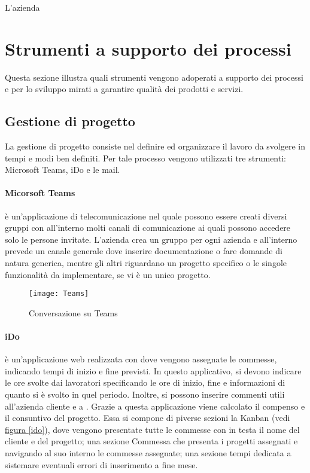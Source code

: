 L'azienda

\newpage

\section{Strumenti a supporto dei processi}
\label{cap1:Strumenti a supporto dei processi}

Questa sezione illustra quali strumenti vengono adoperati a supporto dei processi e per lo sviluppo mirati a garantire qualità dei prodotti e servizi.

\subsection{Gestione di progetto}
\label{cap1:Gestione di progetto}

La gestione di progetto consiste nel definire ed organizzare il lavoro da svolgere in tempi e modi ben definiti. Per tale processo vengono utilizzati tre strumenti: Microsoft Teams, iDo e le mail.

\paragraph{Micorsoft Teams} è un'applicazione di telecomunicazione nel quale possono essere creati diversi gruppi con all'interno molti canali di comunicazione ai quali possono accedere solo le persone invitate. L'azienda crea un gruppo per ogni azienda e all'interno prevede un canale generale dove inserire documentazione o fare domande di natura generica, mentre gli altri riguardano un progetto specifico o le singole funzionalità da implementare, se vi è un unico progetto. 

\begin{figure}[!h] 
	\centering 
	\texttt{[image: Teams]} 
	\caption{Conversazione su Teams}
\end{figure}


\paragraph{iDo} è un'applicazione web realizzata con \inde dove vengono assegnate le commesse, indicando tempi di inizio e fine previsti. In questo applicativo, si devono indicare le ore svolte dai lavoratori specificando le ore di inizio, fine e informazioni di quanto si è svolto in quel periodo. Inoltre, si possono inserire commenti utili all'azienda cliente e a \azienda. 
Grazie a questa applicazione viene calcolato il compenso e il consuntivo del progetto. Essa si compone di piverse sezioni la Kanban (vedi \hyperref[ido]{figura \ref{ido}}), dove vengono presentate tutte le commesse con in testa il nome del cliente e del progetto; una sezione Commessa che presenta i progetti assegnati e navigando al suo interno le commesse assegnate; una sezione tempi dedicata a sistemare eventuali errori di inserimento a fine mese.

